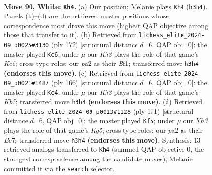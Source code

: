 \documentclass[11pt]{article}
\begin{document}
\clearpage

\begin{figure}[p]\centering
\begin{subfigure}{0.46\textwidth}\centering
\resizebox{\linewidth}{!}{%
\newchessgame
\chessboard[
  setfen={8/8/8/2p1k3/8/3p3K/p7/8 w - - 0 90},
  showmover=false,
  pgfstyle=straightmove, color=movearrow, markmove={h3-h4}
]}
\caption{}
\end{subfigure}\hfill
\begin{subfigure}{0.46\textwidth}\centering
\resizebox{\linewidth}{!}{%
\newchessgame
\chessboard[
  setfen={8/7k/8/2K5/5p2/8/8/5B2 w - - 0 87},
  showmover=false,
  pgfstyle=straightmove, color=movearrow, markmove={c5-c6}
]}
\caption{}
\end{subfigure}
\\[4pt]
\begin{subfigure}{0.46\textwidth}\centering
\resizebox{\linewidth}{!}{%
\newchessgame
\chessboard[
  setfen={8/5pk1/8/1K4p1/8/8/8/8 w - - 0 84},
  showmover=false,
  pgfstyle=straightmove, color=movearrow, markmove={b5-c4}
]}
\caption{}
\end{subfigure}\hfill
\begin{subfigure}{0.46\textwidth}\centering
\resizebox{\linewidth}{!}{%
\newchessgame
\chessboard[
  setfen={8/2b5/2P5/8/6k1/3K4/8/8 b - - 2 86},
  showmover=false,
  pgfstyle=straightmove, color=movearrow, markmove={g4-f5}
]}
\caption{}
\end{subfigure}
\caption{\textbf{Move 90, White: \texttt{Kh4}.} (a) Our position; Melanie plays \texttt{Kh4} (\texttt{h3h4}). Panels (b)--(d) are the retrieved master positions whose correspondence most drove this move (highest QAP objective among those that transfer to it). (b) Retrieved from \texttt{lichess\_elite\_2024-09\_p0025\#3130} (ply 172) [structural distance $d$=6, QAP obj=0]: the master played \texttt{Kc6}; under $\mu$ our \emph{Kh3} plays the role of that game's \emph{Kc5}; cross-type roles: our \emph{p}a2 as their \emph{B}f1; transferred move \texttt{h3h4} \textbf{(endorses this move)}. (c) Retrieved from \texttt{lichess\_elite\_2024-09\_p0021\#1487} (ply 166) [structural distance $d$=6, QAP obj=0]: the master played \texttt{Kc4}; under $\mu$ our \emph{Kh3} plays the role of that game's \emph{Kb5}; transferred move \texttt{h3h4} \textbf{(endorses this move)}. (d) Retrieved from \texttt{lichess\_elite\_2024-09\_p0013\#1128} (ply 171) [structural distance $d$=6, QAP obj=0]: the master played \texttt{Kf5}; under $\mu$ our \emph{Kh3} plays the role of that game's \emph{Kg5}; cross-type roles: our \emph{p}a2 as their \emph{B}c7; transferred move \texttt{h3h4} \textbf{(endorses this move)}. Synthesis: 13 retrieved analogs transferred to \texttt{Kh4} (summed QAP objective 0, the strongest correspondence among the candidate moves); Melanie committed it via the \texttt{search} selector.}
\label{fig:thought-m178}
\end{figure}
\end{document}
